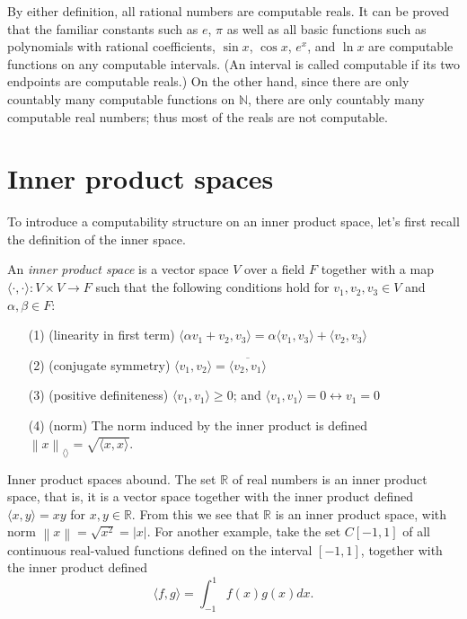 \documentclass[a4paper,10pt]{article}
\begin{document}
By either definition, all rational numbers are computable reals. It can be proved that the familiar constants such as $e$, $\pi$ as well as all 
basic functions such as polynomials with rational coefficients, $\sin x$, $\cos x$, $e^{x}$, and $\ln x$ are computable functions on any computable intervals. (An interval is called computable if its two endpoints are computable reals.) On the other hand, since there are only countably many computable functions on $\mathbb N$, there are only countably many computable real numbers; thus most of the reals are not computable. 

\section{Inner product spaces}


To introduce a computability structure on an inner product space, let's first recall the definition of the inner space. 

\begin{definition}
 An \emph{inner product space} is a vector space $V$ over a field $F$ together with a map $\langle \cdot,\cdot \rangle : V \times V \to F$ such that the following conditions hold for $v_1, v_2, v_3 \in V$ and $\alpha, \beta \in F$:

 \begin{itemize}
  \item[(1)] (linearity in first term) $\langle\alpha v_1+v_2,v_3 \rangle = \alpha\langle v_1,v_3 \rangle + \langle v_2,v_3 \rangle$
  \item[(2)] (conjugate symmetry) $\langle v_1, v_2 \rangle = \overline{\langle v_2, v_1 \rangle}$
  \item[(3)] (positive definiteness) $\langle v_1, v_1 \rangle \geq 0$; and $\langle v_1, v_1 \rangle = 0 \leftrightarrow v_1 = 0$
  \item[(4)] (norm) The norm induced by the inner product is defined $\left\|x\right\|_{\langle\rangle} = \sqrt{\langle x, x \rangle}$.
 \end{itemize}

\end{definition}

Inner product spaces abound.  The set $\mathbb{R}$ of real numbers is an inner product space, that is, it is a vector space together with the inner product defined $\langle x, y \rangle = xy$ for $x, y \in \mathbb{R}$.  From this we see that $\mathbb{R}$ is an inner product space, with norm $\left\|x\right\| = \sqrt{x^2} = \left|x\right|$. For another example, take the set $C\left[-1, 1\right]$ of all continuous real-valued functions defined on the interval $\left[-1, 1\right]$, together with the inner product defined
\[\langle f, g \rangle = \int_{-1}^{1} f(x){g(x)}dx.\]
\end{document}
